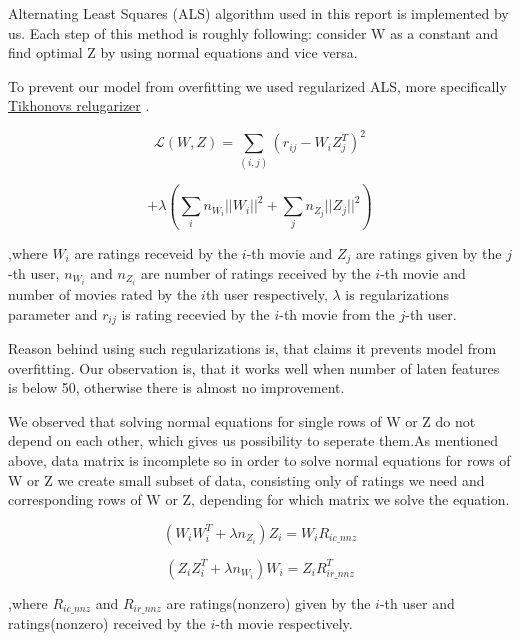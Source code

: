 Alternating Least Squares (ALS) algorithm used in this report is implemented by us. Each step of this method is roughly following: consider W as a constant and find optimal Z by using normal equations and vice versa. 

To prevent our model from overfitting we used regularized ALS, more specifically 
\href{https://en.wikipedia.org/wiki/Tikhonov_regularization}{Tikhonovs relugarizer}
. 

$$ \mathcal{L}(W,Z)=\sum_{(i,j)}(r_{ij}-W_iZ_j^T)^2$$

$$+\lambda(\sum_i n_{W_i}||W_i||^2+\sum_j n_{Z_j}||Z_j||^2)$$

,where $W_i$ are ratings receveid by the $i$-th movie and $Z_j$ are ratings given by the $j$-th user,  $n_{W_i}$ and $n_{Z_i}$ are number of ratings received by the $i$-th movie and number of movies rated by the $i$th user respectively, $\lambda$ is regularizations parameter and $r_{ij}$ is rating recevied by the $i$-th movie from the $j$-th user.

Reason behind using such regularizations is, that 
\cite{Zhou2008}
 claims it prevents model from overfitting. Our observation is, that it works well when number of laten features is below 50, otherwise there is almost no improvement. 

We observed that solving normal equations for single rows of W or Z do not depend on each other, which gives us possibility to seperate them.As mentioned above, data matrix is incomplete so in order to solve normal equations for rows of W or Z we create small subset of data, consisting only of ratings we need and corresponding rows of W or Z, depending for which matrix we solve the equation. 

$$(W_iW_i^T + \lambda n_{Z_i})Z_i=W_iR_{ic\_nnz} $$

$$(Z_iZ_i^T + \lambda n_{W_i})W_i=Z_iR^T_{ir\_nnz}$$

,where $R_{ic\_nnz}$ and $R_{ir\_nnz}$ are ratings(nonzero) given by the $i$-th user and ratings(nonzero) received by the $i$-th movie respectively.




